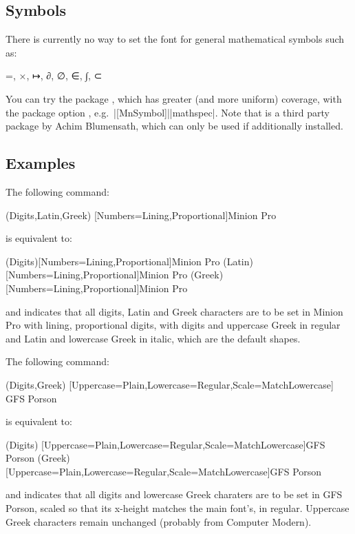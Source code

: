 \documentclass{ltxdockit}
\newcommand\MP[1]{{\MathematicalPi #1}}
\newcommand\permitbreak{\linebreak[0]}
\begin{document}
\subsection{Symbols}

There is currently no way to set the font for general mathematical symbols such as:
\begin{center}
\MP =, \MP ×, \MP ↦, \MP ∂, \MP ∅, \MP ∈, \MP ∫, \MP ⊂
\end{center}
You can try the package , which has greater (and more uniform) coverage, with the package option , e.g.\ |[MnSymbol]|\permitbreak|{mathspec}|. Note that  is a third party package by Achim Blumensath, which can only be used if additionally installed.

\subsection{Examples}

The following command:
\begin{example}
\setmathsfont(Digits,Latin,Greek)
    [Numbers={Lining,Proportional}]{Minion Pro}
\end{example}
is equivalent to:
\begin{example}
\setmathsfont(Digits)[Numbers={Lining,Proportional}]{Minion Pro}
\setmathsfont(Latin)[Numbers={Lining,Proportional}]{Minion Pro}
\setmathsfont(Greek)[Numbers={Lining,Proportional}]{Minion Pro}
\end{example}
and indicates that all digits, Latin and Greek characters are to be set in Minion Pro with lining, proportional digits, with digits and uppercase Greek in regular and Latin and lowercase Greek in italic, which are the default shapes.

The following command:
\begin{example}
\setmathsfont(Digits,Greek)
    [Uppercase=Plain,Lowercase=Regular,Scale=MatchLowercase]
    {GFS Porson}
\end{example}
is equivalent to:
\begin{example}
\setmathsfont(Digits)
    [Uppercase=Plain,Lowercase=Regular,Scale=MatchLowercase]{GFS Porson}
\setmathsfont(Greek)
    [Uppercase=Plain,Lowercase=Regular,Scale=MatchLowercase]{GFS Porson}
\end{example}
and indicates that all digits and lowercase Greek charaters are to be set in GFS Porson, scaled so that its x-height matches the main font’s, in regular. Uppercase Greek characters remain unchanged (probably from Computer Modern).
\end{document}
